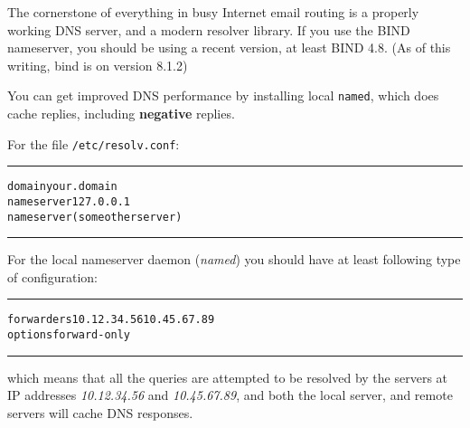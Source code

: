 



The cornerstone of everything in busy Internet email routing is a properly
working DNS server, and a modern resolver library. If you use the BIND 
nameserver, you should be using a recent version, at least BIND 4.8.
(As of this writing, bind is on version 8.1.2)

You can get improved DNS performance by installing local {\tt named},
which does cache replies, including {\bf negative} replies.

For the file {\tt /etc/resolv.conf}:
\begin{alltt}\medskip\hrule\medskip
domain     your.domain
nameserver 127.0.0.1
nameserver (some other server)
\medskip\hrule\medskip\end{alltt}


For the local nameserver daemon ({\em named}) you should have
at least following type of configuration:
\begin{alltt}\medskip\hrule\medskip
forwarders 10.12.34.56  10.45.67.89
options forward-only
\medskip\hrule\medskip\end{alltt}

which means that all the queries are attempted to be resolved
by the servers at IP addresses {\em 10.12.34.56} and
{\em 10.45.67.89}, and both the local server, and remote
servers will cache DNS responses.

